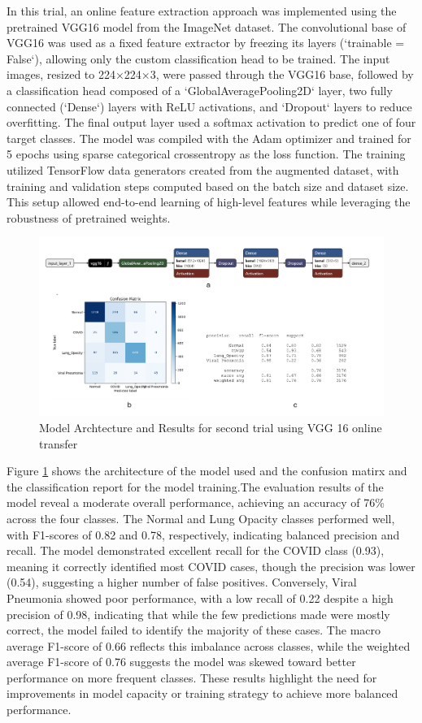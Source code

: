 \documentclass{article}
\begin{document}
In this trial, an online feature extraction approach was implemented using the pretrained VGG16 model from the ImageNet dataset. The convolutional base of VGG16 was used as a fixed feature extractor by freezing its layers (`trainable = False`), allowing only the custom classification head to be trained. The input images, resized to 224×224×3, were passed through the VGG16 base, followed by a classification head composed of a `GlobalAveragePooling2D` layer, two fully connected (`Dense`) layers with ReLU activations, and `Dropout` layers to reduce overfitting. The final output layer used a softmax activation to predict one of four target classes. The model was compiled with the Adam optimizer and trained for 5 epochs using sparse categorical crossentropy as the loss function. The training utilized TensorFlow data generators created from the augmented dataset, with training and validation steps computed based on the batch size and dataset size. This setup allowed end-to-end learning of high-level features while leveraging the robustness of pretrained weights.
\begin{figure}[h!] %
    \centering
    \includegraphics[width=1.0\linewidth]{vgg16online1.png}
    \caption{Model Archtecture and Results for second trial using VGG 16 online transfer}
    \label{fig:vgg16result1.png}
\end{figure}
Figure \ref{fig:vgg16result1.png} shows the architecture of the model used and the confusion matirx and the classification report for the model training.The evaluation results of the model reveal a moderate overall performance, achieving an accuracy of 76\% across the four classes. The Normal and Lung Opacity classes performed well, with F1-scores of 0.82 and 0.78, respectively, indicating balanced precision and recall. The model demonstrated excellent recall for the COVID class (0.93), meaning it correctly identified most COVID cases, though the precision was lower (0.54), suggesting a higher number of false positives. Conversely, Viral Pneumonia showed poor performance, with a low recall of 0.22 despite a high precision of 0.98, indicating that while the few predictions made were mostly correct, the model failed to identify the majority of these cases. The macro average F1-score of 0.66 reflects this imbalance across classes, while the weighted average F1-score of 0.76 suggests the model was skewed toward better performance on more frequent classes. These results highlight the need for improvements in model capacity or training strategy to achieve more balanced performance.
\end{document}
